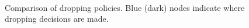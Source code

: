 \begin{figure}
\begin{center}
{    \label{fig:drop.source_drop}
  }
  \vspace{-0.1in}
  \\
  \end{center}
  \vspace{-0.2in}
  \caption{Comparison of dropping policies. Blue (dark) nodes indicate where
  dropping decisions are made.}
  \label{fig:drop.policies}
\end{figure}

